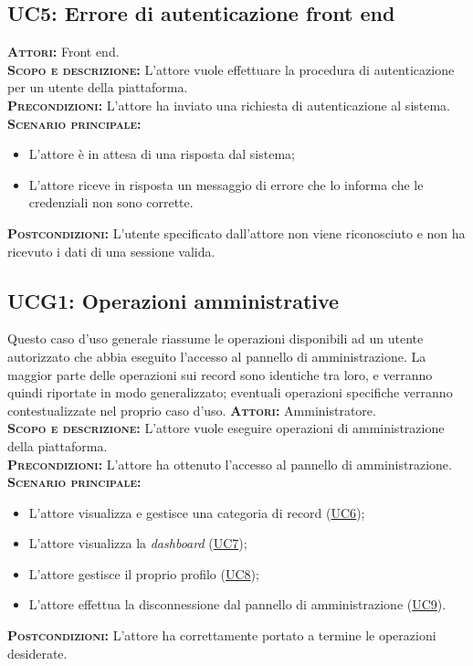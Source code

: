 \subsection{UC5: Errore di autenticazione front end}
\label{sec:UC5}
\textsc{\textbf{Attori:}} Front end.\\
\textsc{\textbf{Scopo e descrizione:}} L'attore vuole effettuare la procedura di autenticazione per un utente della piattaforma.\\
\textsc{\textsc{\textbf{Precondizioni:}}} L'attore ha inviato una richiesta di autenticazione al sistema.\\
\textsc{\textbf{Scenario principale:}} 
\begin{itemize}
    \item L'attore è in attesa di una risposta dal sistema;
    \item L'attore riceve in risposta un messaggio di errore che lo informa che le credenziali non sono corrette.
\end{itemize}
\textsc{\textbf{Postcondizioni:}} L'utente specificato dall'attore non viene riconosciuto e non ha ricevuto i dati di una sessione valida.

\subsection{UCG1: Operazioni amministrative}
\label{sec:ucg1}
Questo caso d'uso generale riassume le operazioni disponibili ad un utente autorizzato che abbia eseguito l'accesso al pannello di amministrazione. La maggior parte delle operazioni sui record sono identiche tra loro, e verranno quindi riportate in modo generalizzato; eventuali operazioni specifiche verranno contestualizzate nel proprio caso d'uso.
\textsc{\textbf{Attori:}} Amministratore.\\
\textsc{\textbf{Scopo e descrizione:}} L'attore vuole eseguire operazioni di amministrazione della piattaforma.\\
\textsc{\textsc{\textbf{Precondizioni:}}} L'attore ha ottenuto l'accesso al pannello di amministrazione.\\
\textsc{\textbf{Scenario principale:}} 
\begin{itemize}
    \item L'attore visualizza e gestisce una categoria di record (\hyperref[sec:UC6]{UC6});
    \item L'attore visualizza la \textit{dashboard} (\hyperref[sec:UC7]{UC7});
    \item L'attore gestisce il proprio profilo (\hyperref[sec:UC8]{UC8});
    \item L'attore effettua la disconnessione dal pannello di amministrazione (\hyperref[sec:UC9]{UC9}).
\end{itemize}
\textsc{\textbf{Postcondizioni:}} L'attore ha correttamente portato a termine le operazioni desiderate.


